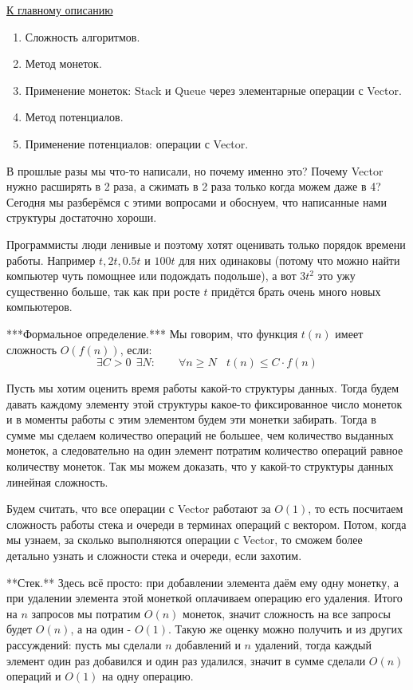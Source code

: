 \label{md2tex5}
\hyperref[md2texREADME]{К главному описанию}


\begin{enumerate}
    \item Сложность алгоритмов.
    \item Метод монеток.
    \item Применение монеток: Stack и Queue через элементарные операции с Vector.
    \item Метод потенциалов.
    \item Применение потенциалов: операции с Vector.
\end{enumerate}


В прошлые разы мы что-то написали, но почему именно это? Почему Vector нужно расширять в 2 раза, а сжимать в 2 раза только когда можем даже в 4? Сегодня мы разберёмся с этими вопросами и обоснуем, что написанные нами структуры достаточно хороши.


Программисты люди ленивые и поэтому хотят оценивать только порядок времени работы. Например $t, 2t, 0.5t$ и $100t$ для них одинаковы (потому что можно найти компьютер чуть помощнее или подождать подольше), а вот $3t^2$ это ужу существенно больше, так как при росте $t$ придётся брать очень много новых компьютеров.

***Формальное определение.*** Мы говорим, что функция $t(n)$ имеет сложность $O(f(n))$, если:
$$\exists C > 0\ \ \exists N: \qquad \forall n \geq N \ \ \ \ t(n) \leq C \cdot f(n)$$


Пусть мы хотим оценить время работы какой-то структуры данных. Тогда будем давать каждому элементу этой структуры какое-то фиксированное число монеток и в моменты работы с этим элементом будем эти монетки забирать. Тогда в сумме мы сделаем количество операций не большее, чем количество выданных монеток, а следовательно на один элемент потратим количество операций равное количеству монеток. Так мы можем доказать, что у какой-то структуры данных линейная сложность.


Будем считать, что все операции с Vector работают за $O(1)$, то есть посчитаем сложность работы стека и очереди в терминах операций с вектором. Потом, когда мы узнаем, за сколько выполняются операции с Vector, то сможем более детально узнать и сложности стека и очереди, если захотим.

**Стек.** Здесь всё просто: при добавлении элемента даём ему одну монетку, а при удалении элемента этой монеткой оплачиваем операцию его удаления. Итого на $n$ запросов мы потратим $O(n)$ монеток, значит сложность на все запросы будет $O(n)$, а на один - $O(1)$. Такую же оценку можно получить и из других рассуждений: пусть мы сделали $n$ добавлений и $n$ удалений, тогда каждый элемент один раз добавился и один раз удалился, значит в сумме сделали $O(n)$ операций и $O(1)$ на одну операцию.

